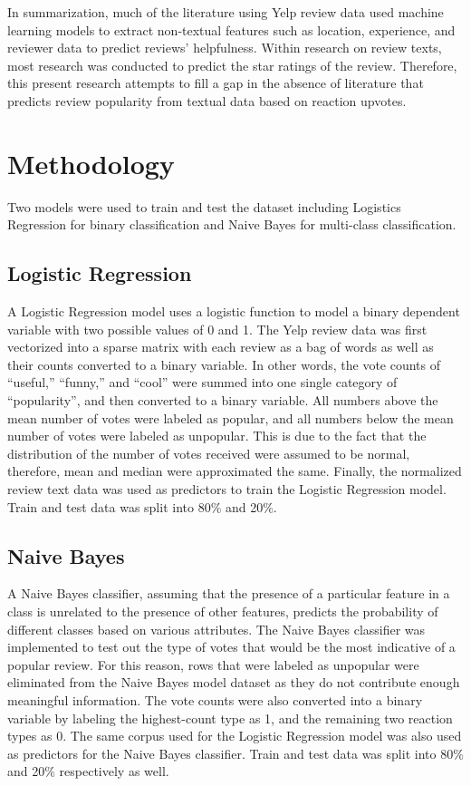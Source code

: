 \documentclass[11pt,a4paper]{article}
\begin{document}
In summarization, much of the literature using Yelp review data used machine learning models to extract non-textual features such as location, experience, and reviewer data to predict reviews’ helpfulness. Within research on review texts, most research was conducted to predict the star ratings of the review. Therefore, this present research attempts to fill a gap in the absence of literature that predicts review popularity from textual data based on reaction upvotes.

\section{Methodology}
Two models were used to train and test the dataset including Logistics Regression for binary classification and Naive Bayes for multi-class classification.

\subsection{Logistic Regression}
A Logistic Regression model uses a logistic function to model a binary dependent variable with two possible values of 0 and 1. The Yelp review data was first vectorized into a sparse matrix with each review as a bag of words as well as their counts converted to a binary variable. In other words, the vote counts of “useful,” “funny,” and “cool” were summed into one single category of “popularity”, and then converted to a binary variable. All numbers above the mean number of votes were labeled as popular, and all numbers below the mean number of votes were labeled as unpopular. This is due to the fact that the distribution of the number of votes received were assumed to be normal, therefore, mean and median were approximated the same. Finally, the normalized review text data was used as predictors to train the Logistic Regression model. Train and test data was split into 80\% and 20\%.

\subsection{Naive Bayes}
A Naive Bayes classifier, assuming that the presence of a particular feature in a class is unrelated to the presence of other features, predicts the probability of different classes based on various attributes. The Naive Bayes classifier was implemented to test out the type of votes that would be the most indicative of a popular review. For this reason, rows that were labeled as unpopular were eliminated from the Naive Bayes model dataset as they do not contribute enough meaningful information. The vote counts were also converted into a binary variable by labeling the highest-count type as 1, and the remaining two reaction types as 0. The same corpus used for the Logistic Regression model was also used as predictors for the Naive Bayes classifier. Train and test data was split into 80\% and 20\% respectively as well.
\end{document}
